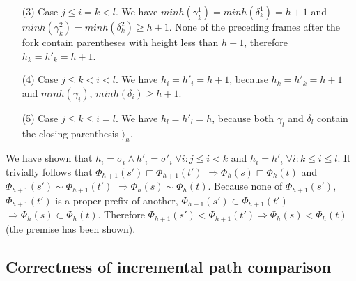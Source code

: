 \documentclass[AMA,STIX1COL]{WileyNJD-v2}
\newcommand{\Xr}{\rangle}
\begin{document}
\begin{proofEnd}
\begin{itemize}[itemsep=0.2em, topsep=0.5em]
    \item[(3)]
        Case $j \leq i = k < l$. We have
        $minh (\gamma^1_k) = minh (\delta^1_k) = h + 1$ and
        $minh (\gamma^2_k) = minh (\delta^2_k) \geq h + 1$.
        None of the preceding frames after the fork contain parentheses with height less than $h + 1$,
        therefore $h_k = h'_k = h + 1$.

    \item[(4)]
        Case $j \leq k < i < l$.
        We have $h_i = h'_i = h + 1$,
        because $h_k = h'_k = h + 1$ and $minh(\gamma_i)$, $minh(\delta_i) \geq h + 1$.

    \item[(5)]
        Case $j \leq k \leq i = l$.
        We have $h_l = h'_l = h$,
        because both $\gamma_l$ and $\delta_l$ contain the closing parenthesis $\Xr_{h}$.
    \end{itemize}
    We have shown that $h_i = \sigma_i \wedge h'_i = \sigma'_i \;\forall i: j \leq i < k$
    and $h_i = h'_i \;\forall i: k \leq i \leq l$.
    It trivially follows that $\Phi_{h+1}(s') \sqsubset \Phi_{h+1}(t')$ $\Rightarrow \Phi_{h}(s) \sqsubset \Phi_{h}(t)$
    and $\Phi_{h+1}(s') \sim \Phi_{h+1}(t')$ $\Rightarrow \Phi_{h}(s) \sim \Phi_{h}(t)$.
    Because none of $\Phi_{h+1}(s')$, $\Phi_{h+1}(t')$ is a proper prefix of another,
    $\Phi_{h+1}(s') \subset \Phi_{h+1}(t')$ $\Rightarrow \Phi_{h}(s) \subset \Phi_{h}(t)$.
    Therefore $\Phi_{h+1}(s') < \Phi_{h+1}(t') \Rightarrow \Phi_{h}(s) < \Phi_{h}(t)$
    (the premise has been shown).
\end{proofEnd}



\subsection*{Correctness of incremental path comparison}

\end{document}
